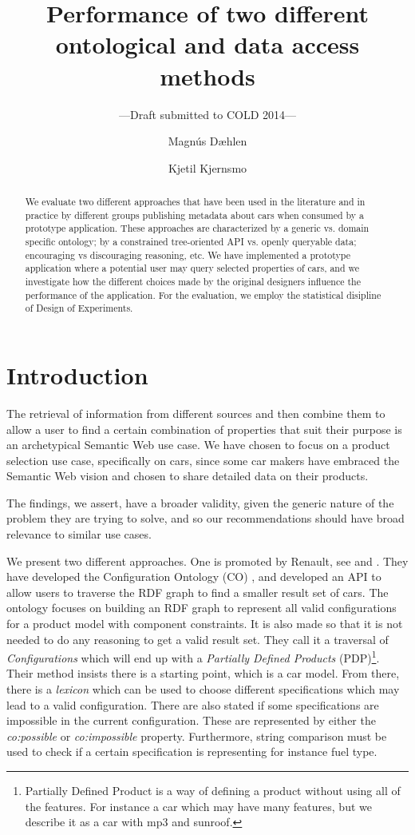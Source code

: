 \documentclass{llncs}
\title{Performance of two different ontological and data access methods}
\author{Magn\'{u}s D\ae hlen \and Kjetil Kjernsmo}
\institute{Department of Informatics,
Postboks 1080 Blindern,
N-0316 Oslo, Norway \email{\{magnudae,kjekje\}@ifi.uio.no} }
\subtitle{---Draft submitted to COLD 2014---}
\begin{document}
\maketitle

\begin{abstract}
  We evaluate two different approaches that have been used in the
  literature and in practice by different groups publishing metadata
  about cars when consumed by a prototype application. These
  approaches are characterized by a generic vs. domain specific
  ontology; by a constrained tree-oriented API vs. openly queryable
  data; encouraging vs discouraging reasoning, etc.  We have
  implemented a prototype application where a potential user may query
  selected properties of cars, and we investigate how the different
  choices made by the original designers influence the performance of
  the application. For the evaluation, we employ the statistical
  disipline of Design of Experiments.

\end{abstract}

\section{Introduction}

The retrieval of information from different sources and then combine
them to allow a user to find a certain combination of properties that
suit their purpose is an archetypical Semantic Web use case. We have
chosen to focus on a product selection use case, specifically on cars,
since some car makers have embraced the Semantic Web vision and chosen
to share detailed data on their products.

The findings, we assert, have a broader validity, given the generic
nature of the problem they are trying to solve, and so our
recommendations should have broad relevance to similar use cases.

We present two different approaches. One is promoted by Renault, see
\cite{SemWebAppRes} and \cite{ren1}. They have developed the
Configuration Ontology (CO) \cite{confOnt}, and developed an API to allow
users to traverse the RDF graph to find a smaller result set of cars.
The ontology focuses on building an RDF graph to represent all valid
configurations for a product model with component constraints.  It is
also made so that it is not needed to do any reasoning to get a valid
result set.  They call it a traversal of \emph{Configurations} which
will end up with a \emph{Partially Defined Products}
(PDP)\footnote{Partially Defined Product is a way of defining a
  product without using all of the features. For instance a car which
  may have many features, but we describe it as a car with mp3 and
  sunroof.}.  Their method insists there is a starting point, which is
a car model. From there, there is a \emph{lexicon} which can be used
to choose different specifications which may lead to a valid
configuration. There are also stated if some specifications are
impossible in the current configuration.  These are represented by
either the \emph{co:possible} or \emph{co:impossible}
property. Furthermore, string comparison must be used to check if a
certain specification is representing for instance fuel type.
\end{document}
